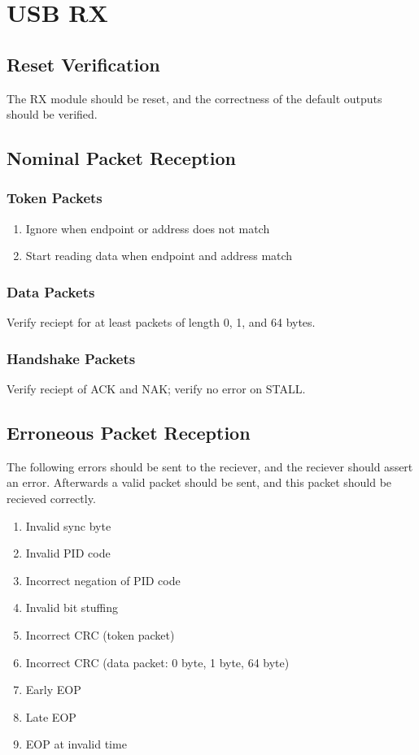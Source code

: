 \documentclass{scrartcl}
\begin{document}
\section{USB RX}
\subsection{Reset Verification}
The RX module should be reset, and the correctness of the default outputs should be verified.

\subsection{Nominal Packet Reception}
\subsubsection{Token Packets}
\begin{enumerate}
    \item Ignore when endpoint or address does not match
    \item Start reading data when endpoint and address match
\end{enumerate}

\subsubsection{Data Packets}
Verify reciept for at least packets of length 0, 1, and 64 bytes.

\subsubsection{Handshake Packets}
Verify reciept of ACK and NAK; verify no error on STALL.

\subsection{Erroneous Packet Reception}
The following errors should be sent to the reciever, and the reciever should assert an error. Afterwards a valid
packet should be sent, and this packet should be recieved correctly.
\begin{enumerate}
    \item Invalid sync byte
    \item Invalid PID code
    \item Incorrect negation of PID code
    \item Invalid bit stuffing
    \item Incorrect CRC (token packet)
    \item Incorrect CRC (data packet: 0 byte, 1 byte, 64 byte)
    \item Early EOP
    \item Late EOP
    \item EOP at invalid time
\end{enumerate}
\end{document}

